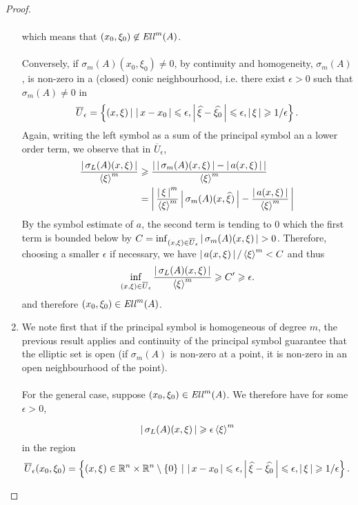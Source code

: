 \documentclass{article}
\begin{document}
\begin{proof}
\begin{enumerate}
\begin{align*}
        \end{align*}
        which means that $(x_0, \xi_0) \not \in \Ell^m(A)$. \\
        \\
        Conversely, if $\sigma_m(A)(x_0, \xi_0) \neq 0$, by continuity and homogeneity,  $\sigma_m(A)$, is non-zero in a (closed) conic neighbourhood, i.e. there exist $\epsilon > 0$ such that $\sigma_m(A) \neq 0$ in 
        \begin{align*}
        \overline{U}_\epsilon = \set{(x, \xi) \wh \abs{x - x_0} \leq \epsilon, \abs{\widehat{\xi} - \widehat{\xi_0}}\leq \epsilon, \abs{\xi} \geq 1/ \epsilon}. 
        \end{align*}
        Again, writing the left symbol as a sum of the principal symbol an a lower order term, we observe that in $\overline{U}_\epsilon$, 
        \begin{align*}
        \frac{\abs{\sigma_L(A)(x, \xi)} }{\sym[\xi]^m}
        & \geq \frac{\abs{\abs{\sigma_m(A)(x, \xi)} - \abs{a(x, \xi)}}}{\sym[\xi]^m} \\
        & = \abs{\frac{\abs{\xi}^m}{\sym[\xi]^m} \abs{\sigma_m(A)(x, \widehat{\xi})} - \frac{\abs{a(x, \xi)}}{\sym[\xi]^m}} \\
        \end{align*}
        By the symbol estimate of $a$, the second term is tending to $0$ which the first term is bounded below by $C = \inf_{(x, \xi) \in \overline{U}_\epsilon} \abs{\sigma_m(A)(x, \xi)} > 0$. Therefore, choosing a smaller $\epsilon$ if necessary, we have $\abs{a(x, \xi)} / \sym[\xi]^m < C$ and thus 
        \begin{align*}
        \inf_{(x, \xi) \in \overline{U}_\epsilon} \frac{\abs{\sigma_L(A)(x, \xi)} }{\sym[\xi]^m}
        \geq C' 
        \geq \epsilon. 
        \end{align*}
        and therefore $(x_0, \xi_0) \in \Ell^m(A)$. 
        
        \item We note first that if the principal symbol is homogeneous of degree $m$, the previous result applies and continuity of the principal symbol guarantee that the elliptic set is open (if $\sigma_m(A)$ is non-zero at a point, it is non-zero in an open neighbourhood of the point). \\
        \\
        For the general case, suppose $(x_0, \xi_0) \in \Ell^m(A)$. We therefore have for some $\epsilon > 0$, 
        
         \[
        \abs{\sigma_L(A)(x, \xi)} \geq \epsilon \sym[\xi]^m
        \]
        in the region
        \[
        \overline{U}_\epsilon(x_0, \xi_0) = \set{(x, \xi) \in \R^n \times \R^n \setminus \set{0} \wh \abs{x - x_0} \leq \epsilon, \abs{\widehat{\xi} - \widehat{\xi_0}} \leq \epsilon, \abs{\xi} \geq 1/\epsilon}. 
        \]
        

\end{enumerate}
\end{proof}
\end{document}
